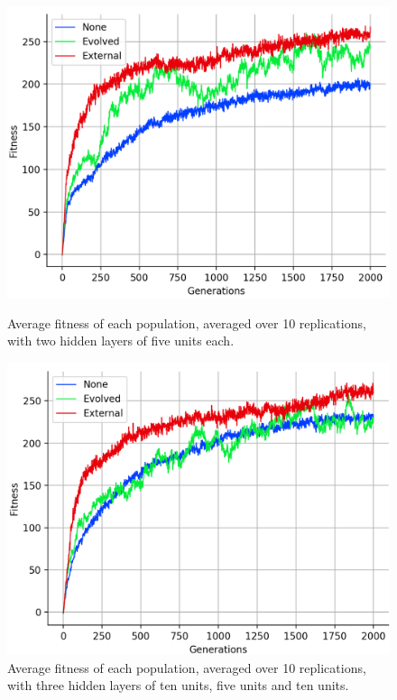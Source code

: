 \documentclass[12pt,a4paper]{report}
\begin{document}
\begin{figure}[t]
   \centering
   \begin{minipage}{0.49\textwidth}
          \centering
          \captionsetup{width=.9\linewidth}
          \includegraphics[width=1.\linewidth]{results/average-55.png}
          \caption{Average fitness of each population, averaged over 10 replications, with two hidden layers of five units each.}
          \label{fig:average-55}
   \end{minipage}
   \begin{minipage}{0.49\textwidth}
          \centering
          \captionsetup{width=.9\linewidth}
          \includegraphics[width=1.\linewidth]{results/average-10510.png}
          \caption{Average fitness of each population, averaged over 10 replications, with three hidden layers of ten units, five units and ten units.}
          \label{fig:average-10510}
   \end{minipage}
\end{figure}
\end{document}
